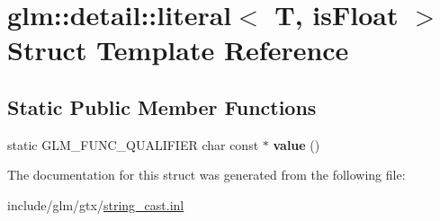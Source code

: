 \hypertarget{structglm_1_1detail_1_1literal}{}\section{glm\+:\+:detail\+:\+:literal$<$ T, is\+Float $>$ Struct Template Reference}
\label{structglm_1_1detail_1_1literal}
\subsection*{Static Public Member Functions}
\begin{DoxyCompactItemize}
\item 
\mbox{\label{structglm_1_1detail_1_1literal_a14fd9d6fec8d35f7a2fd3b0095d17b6a}} 
static G\+L\+M\+\_\+\+F\+U\+N\+C\+\_\+\+Q\+U\+A\+L\+I\+F\+I\+ER char const  $\ast$ {\bfseries value} ()
\end{DoxyCompactItemize}


The documentation for this struct was generated from the following file\+:\begin{DoxyCompactItemize}
\item 
include/glm/gtx/\hyperlink{string__cast_8inl}{string\+\_\+cast.\+inl}\end{DoxyCompactItemize}
